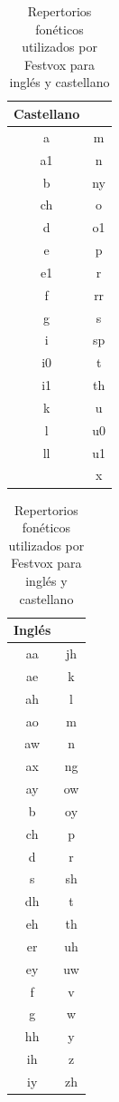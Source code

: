 \begin{table}
\centering
\begin{minipage}[t]{0.3\textwidth}
\begin{tabular}[t]{cc}
\toprule
Castellano \\
\midrule
a & m \\
a1 & n \\
b & ny \\
ch & o \\
d & o1 \\
e & p \\
e1 & r \\
f & rr \\
g & s \\
i & sp \\
i0 & t \\
i1 & th \\
k & u \\
l & u0 \\
ll & u1 \\
 & x \\
\bottomrule
\end{tabular}
\end{minipage}
\begin{minipage}[t]{0.3\textwidth}
\begin{tabular}[t]{cc}
\toprule
Inglés \\ 
\midrule
 aa & jh\\
 ae & k \\
 ah & l \\
 ao & m \\
 aw & n \\
 ax & ng\\
 ay & ow\\
 b  &oy\\
 ch & p \\
 d  &r \\
 s  &sh\\
 dh & t\\
 eh & th \\
 er & uh \\
 ey & uw \\
 f  &v\\
 g  &w\\
 hh & y\\
 ih & z\\
 iy & zh \\
\bottomrule
\end{tabular}
\end{minipage}
\caption{Repertorios fonéticos utilizados por Festvox para inglés y castellano} 
\label{fig:foneRep}
\end{table}

